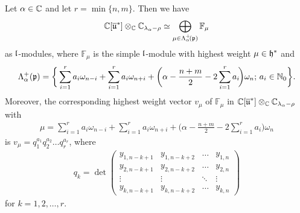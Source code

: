 \begin{proposition}\label{prop:C[u] decomposition AGS}
Let $\alpha \in \mathbb{C}$ and let $r=\min\{n,m\}$. Then we have
\begin{align}
   \mathbb{C}[\overline{\mathfrak{u}}^*] \otimes_{\mathbb{C}} \mathbb{C}_{\lambda_\alpha-\rho} \simeq \bigoplus_{\mu \in \Lambda^+_\alpha\!(\mathfrak{p})} \mathbb{F}_\mu
\end{align}
as $\mathfrak{l}$-modules, where $\mathbb{F}_\mu$ is the simple $\mathfrak{l}$-module with highest weight $\mu \in \mathfrak{h}^*$ and
\begin{align}
 \Lambda^+_\alpha(\mathfrak{p}) = \bigg\{\sum_{i=1}^r a_i \omega_{n-i} + \sum_{i=1}^r a_i \omega_{n+i} + \bigg(\alpha - \frac{n+m}{2} - 2 \sum_{i=1}^r a_i\!\bigg) \omega_n;\, a_i \in \mathbb{N}_0 \bigg\}.
\end{align}
Moreover, the corresponding highest weight vector $v_\mu$ of $\mathbb{F}_\mu$ in $\mathbb{C}[\overline{\mathfrak{u}}^*] \otimes_{\mathbb{C}} \mathbb{C}_{\lambda_\alpha-\rho}$ with
\begin{align}
\mu=\sum_{i=1}^r a_i \omega_{n-i} + \sum_{i=1}^r a_i \omega_{n+i} + \bigg(\alpha - \frac{n+m}{2} - 2 \sum_{i=1}^r a_i\!\bigg) \omega_n
\end{align}
is $v_\mu=q_1^{a_1}q_2^{a_2} \dots q_r^{a_r}$, where
\begin{align} \label{eq:generators hwv AGS}
  q_k = \det\!
  \begin{pmatrix}
    y_{1,n-k+1} & y_{1,n-k+2} & \dots & y_{1,n}\\
    y_{2,n-k+1} & y_{2,n-k+2} & \dots & y_{2,n} \\
    \vdots & \vdots & \ddots & \vdots \\
    y_{k,n-k+1} & y_{k,n-k+2}&  \dots & y_{k,n}
  \end{pmatrix}
\end{align}
for $k=1,2,\dots,r$.
\end{proposition}

